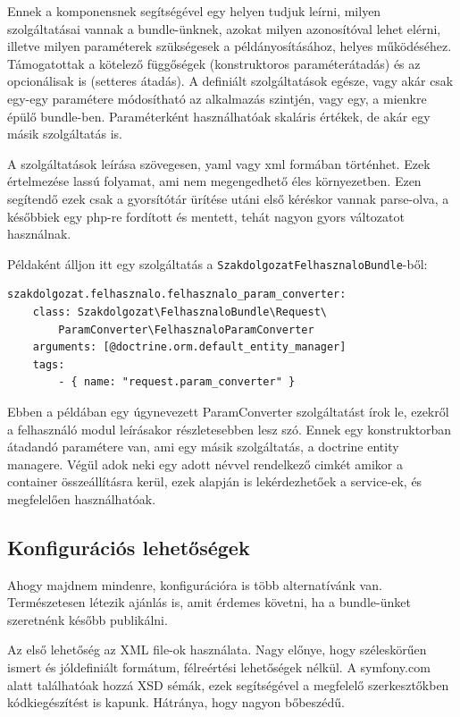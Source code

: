 \documentclass[a4paper,12pt,oneside]{report}
\begin{document}
Ennek a komponensnek segítségével egy helyen tudjuk leírni, milyen szolgáltatásai vannak a bundle-ünknek, azokat milyen azonosítóval lehet elérni, illetve milyen paraméterek szükségesek a példányosításához, helyes működéséhez. Támogatottak a kötelező függőségek (konstruktoros paraméterátadás) és az opcionálisak is (setteres átadás). A definiált szolgáltatások egésze, vagy akár csak egy-egy paramétere módosítható az alkalmazás szintjén, vagy egy, a mienkre épülő bundle-ben. Paraméterként használhatóak skaláris értékek, de akár egy másik szolgáltatás is.

A szolgáltatások leírása szövegesen, yaml vagy xml formában történhet. Ezek értelmezése lassú folyamat, ami nem megengedhető éles környezetben. Ezen segítendő ezek csak a gyorsítótár ürítése utáni első kéréskor vannak parse-olva, a későbbiek egy php-re fordított és mentett, tehát nagyon gyors változatot használnak.

Példaként álljon itt egy szolgáltatás a \texttt{SzakdolgozatFelhasznaloBundle}-ből:

\begin{lstlisting}[]
szakdolgozat.felhasznalo.felhasznalo_param_converter:
    class: Szakdolgozat\FelhasznaloBundle\Request\
        ParamConverter\FelhasznaloParamConverter
    arguments: [@doctrine.orm.default_entity_manager]
    tags:
        - { name: "request.param_converter" }
\end{lstlisting}

Ebben a példában egy úgynevezett ParamConverter szolgáltatást írok le, ezekről a felhasználó modul leírásakor részletesebben lesz szó. Ennek egy konstruktorban átadandó paramétere van, ami egy másik szolgáltatás, a doctrine entity managere. Végül adok neki egy adott névvel rendelkező cimkét \textendash{} amikor a container összeállításra kerül, ezek alapján is lekérdezhetőek a service-ek, és megfelelően használhatóak.

\subsection*{Konfigurációs lehetőségek}

Ahogy majdnem mindenre, konfigurációra is több alternatívánk van. Természetesen létezik ajánlás is, amit érdemes követni, ha a bundle-ünket szeretnénk később publikálni.

Az első lehetőség az XML file-ok használata. Nagy előnye, hogy széleskörűen ismert és jóldefiniált formátum, félreértési lehetőségek nélkül. A symfony.com alatt találhatóak hozzá XSD sémák, ezek segítségével a megfelelő szerkesztőkben kódkiegészítést is kapunk. Hátránya, hogy nagyon bőbeszédű.
\end{document}
